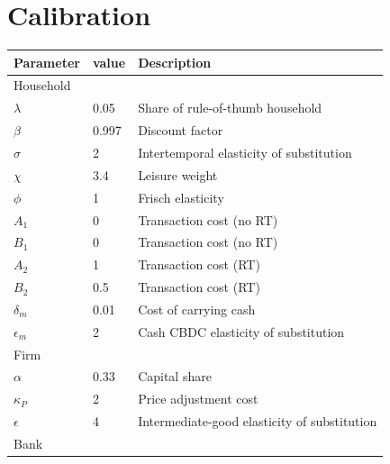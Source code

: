 \documentclass[12pt]{article}
\begin{document}
\clearpage
\section{Calibration}
\begin{table}[h!]
\begin{tabular}{lll}
\hline\hline
Parameter        & value       & Description                 \\\hline
\multicolumn{3}{l}{Household}                                                                     \\
$\lambda$        & 0.05       & Share of rule-of-thumb household                                  \\
$\beta$          & 0.997      & Discount factor                                                   \\
$\sigma$         & 2          & Intertemporal elasticity of substitution                          \\
$\chi$           & 3.4        & Leisure weight                                                    \\
$\phi$           & 1          & Frisch elasticity                                                 \\
$A_1$             & 0          & Transaction cost (no RT)           	     \\
$B_1$              & 0    & Transaction cost (no RT)                    	 \\
$A_2$             & 1          & Transaction cost (RT)                                       \\
$B_2$              & 0.5      & Transaction cost (RT)  	   \\
$\delta_m$ & 0.01 & Cost of carrying cash \\
$\epsilon_m$              & 2      & Cash CBDC elasticity of substitution        \\\hline
\multicolumn{3}{l}{Firm}                                                                     		\\
$\alpha$         & 0.33       & Capital share                                                     \\
$\kappa_P$       & 2          & Price adjustment cost                                             \\
$\epsilon$       & 4          & Intermediate-good elasticity of substitution                      \\\hline
\multicolumn{3}{l}{Bank}                                                                     		\\

\end{tabular}
\end{table}
\end{document}
